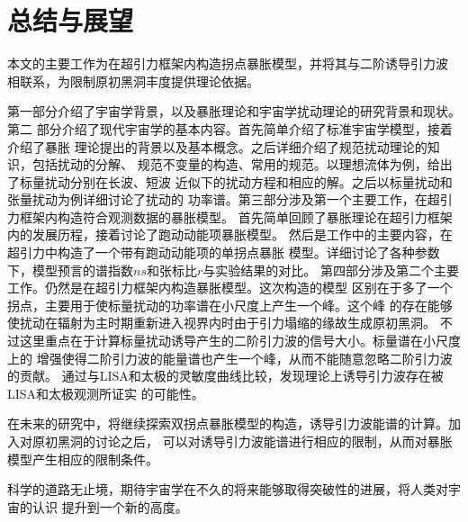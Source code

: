 \chapter{总结与展望}%
\label{chap:summary}
本文的主要工作为在超引力框架内构造拐点暴胀模型，并将其与二阶诱导引力波
相联系，为限制原初黑洞丰度提供理论依据。

第一部分介绍了宇宙学背景，以及暴胀理论和宇宙学扰动理论的研究背景和现状。第二
部分介绍了现代宇宙学的基本内容。首先简单介绍了标准宇宙学模型，接着介绍了暴胀
理论提出的背景以及基本概念。之后详细介绍了规范扰动理论的知识，包括扰动的分解、
规范不变量的构造、常用的规范。以理想流体为例，给出了标量扰动分别在长波、短波
近似下的扰动方程和相应的解。之后以标量扰动和张量扰动为例详细讨论了扰动的
功率谱。第三部分涉及第一个主要工作，在超引力框架内构造符合观测数据的暴胀模型。
首先简单回顾了暴胀理论在超引力框架内的发展历程，接着讨论了跑动动能项暴胀模型。
然后是工作中的主要内容，在超引力中构造了一个带有跑动动能项的单拐点暴胀
模型。详细讨论了各种参数下，模型预言的谱指数$ns$和张标比$r$与实验结果的对比。
第四部分涉及第二个主要工作。仍然是在超引力框架内构造暴胀模型。这次构造的模型
区别在于多了一个拐点，主要用于使标量扰动的功率谱在小尺度上产生一个峰。这个峰
的存在能够使扰动在辐射为主时期重新进入视界内时由于引力塌缩的缘故生成原初黑洞。
不过这里重点在于计算标量扰动诱导产生的二阶引力波的信号大小。标量谱在小尺度上的
增强使得二阶引力波的能量谱也产生一个峰，从而不能随意忽略二阶引力波的贡献。
通过与LISA和太极的灵敏度曲线比较，发现理论上诱导引力波存在被LISA和太极观测所证实
的可能性。

在未来的研究中，将继续探索双拐点暴胀模型的构造，诱导引力波能谱的计算。加入对原初黑洞的讨论之后，
可以对诱导引力波能谱进行相应的限制，从而对暴胀模型产生相应的限制条件。

科学的道路无止境，期待宇宙学在不久的将来能够取得突破性的进展，将人类对宇宙的认识
提升到一个新的高度。

